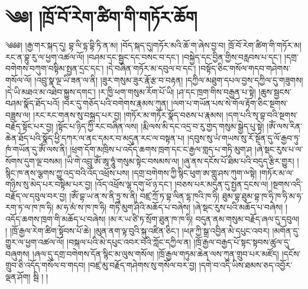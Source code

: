\setcounter{footnote}{0} 
\chapter{༄༅། །ཁྲོ་བོ་རེག་ཚིག་གི་གཏོར་ཆོག}༄༅༅། །རྒྱ་གར་སྐད་དུ། བྷ་ལི་དྷ་བྷི་ཏི་ན་མ། །བོད་སྐད་དུ།གཏོར་མའི་ཆོ་ག་ཞེས་བྱ་བ། ཁྲོ་བོ་རེག་ཚིག་གི་གཏོར་མ། རང་ན་བྷུ་རུ་ལ་ཕྱག་འཚལ་ལོ། །བཤམ་དང་སྦྱང་དང་བསང་བ་དང་། །བསྐྱེད་དང་བྱིན་གྱིས་བརླབས་པ་དང་། །དགྲ་བགེགས་བཀུག་བསྟིམ་སྤྱན་དྲང་དང་། །དེ་བཞིན་གཏོར་མ་དབུལ་བ་དང་། །བསྟོད་ཅིང་གསོལ་གདབ་གཤེགས་གསོལ་ལོ། །འབྲུ་སྣ་ལྔ་ཡི་ཟན་ལ་ནི། །ཟུར་གསུམ་ཟུར་རྣོ་རྩ་བ་བརྟན། །དཀྱིལ་མཐུག་དཔལ་བྱས་དཀྱིལ་དུ་གཟུགས། །དེ་ཡི་མཐའ་མ་འཐེབ་སྐྱུས་དགང་། །ར་ཁྱི་ཕག་གསུམ་རོག་པོ་ཡི། །ཤ་དང་ཁྲག་གིས་བརྒྱན་པ་སྟེ། །ཆུས་སྦྱངས་བཤམ་སྣོད་ཐོད་པའོ། །བར་དུ་གཅོད་པའི་བགེགས་རྣམས་ཀུན། །ལག་པ་གཡོན་པས་སེ་གོལ་རྟོག་ཅིང་སྔགས་བཟླས་ལ། །རང་རང་གནས་སུ་བསྐྲད་པར་བྱ། །གཏོར་མ་གཏོར་སྣོད་བཅས་པ་རྣམས། །དག་པའི་སྭ་བྷ་བའི་སྔགས་བརྗོད་སྟོང་པར་བྱ། །སྟོང་པ་ཉིད་ཀྱི་རང་བཞིན་ལས། །རྨི་ལས་མི་དང་འདྲ་བ་རུ་གྱད་གསུམ་སྒྱེད་པུ་སྟེ། །ཨོཾ་ལས་རིན་ཆེན་ཐོད་པའི་སྣོད་ཕྱི་དཀར་ལ་ནང་དམར་བ་མདུན་རང་ལ་བསྟན་པ། །དབུས་སུ་ཡཾ་གཡས་སུ་རོ་སྔོན་དུ་ལོ་རྒྱབ་ཏུ་ཁཾ་གཡོན་དུ་ཨོཾ་ལས་ནི། །ཕྲག་དོག་མཁྲིས་པ་འདོད་ཆགས་ཁྲག་དང་ང་རྒྱལ་གླད་པ་གཏི་མུག་ཤ །ཞེ་སྡང་རུས་པ་ལ་སོགས་དུག་ལྔ་བསམ། །ཡི་གེ་འབྲུ་ཨོཾ་ཨཱ་ཧཱུཾ་གསུམ་སྟེང་བསམས་ལ། །ཞུ་ནས་དངོས་པོ་ཐིམ་པའི་བདུད་རྩིར་གྱུར། །སྙིང་ཁ་ནས་ལྕགས་ཀྱུ་འདྲ་བའི་འོད་འཕྲོས་པས། །དགྲ་བགེགས་ཀྱི་སྙིང་ཕུག་ཨ་གླུ་ཤས་ཀུག་ྋསྟེ། །གཏོར་མ་ལ་གཉིས་སུ་མེད་པར་བསྟིམ་པར་བྱ། །འོད་འཕྲོས་ལྷ་དགུ་ཕོ་ཉ་དང་། །བཅས་པར་མདུན་དུ་སྤྱན་དྲངས་ལ། །སྔགས་འདི་བརྗོད་ལ་དབུལ་བར་བྱ། །ཨོཾ་བྷ་ཡ་ན་ས་ནི་ཏྲཱ་ས་ནི། བཛྲ་ཀྲོ་ཏ་བྷ་ལིན་དྷ་ཁའི་ཁ་ཧི། ཐུམ་བྷ་ཐུམ་བྷ་ཁ་ཧི་ཁ་ཧི་མ་ཧ་རག་ཏ་ལ་ཁ་ཁ་ཧི། མ་ཧ་མཾ་ས་ཁ་ཁ་ཧི། གཏི་མུག་ཤིའི་མཆོད་པ་བཞེས། །ཞེ་སྡང་རུས་པའི་མཆོད་པ་བཞེས། །འདོད་ཆགས་ཁྲག་གི་མཆོད་པ་བཞེས། །མ་ར་ཡ་ཙི་ཏ་སྲོག་ཐུན་ཁ་ཁ་ཧི། བདུན་ནམ་གསུམ་བརྗོད་ཞལ་དུ་དབུལ། ། །ཁྲོ་རྒྱལ་རེག་ཚིག་སྟོབས་པོ་ཆེ། །མུན་ནག་ལྟ་བུའི་སྐུ་འཛིན་ཅིང་། །ཕཊ་ཀྱི་སྒྲ་འབྱིན་མེ་དཔུང་འབར། །མགོན་དུ་གྱུར་ལ་ཕྱག་འཚལ་ལོ། །བསྐལ་པའི་མེ་དཔུང་འབར་བའི་ཀློང་དཀྱིལ་ན། །ཁྲོ་རྒྱལ་བརྒྱད་པོ་སྟང་སྟབས་ཚུལ་དུ་བཞུགས། །ཞལ་དུ་དགྲ་བགེགས་དོན་སྙིང་མ་ལུས་གསོལ། །ཁྲོ་རྒྱལ་གཏུམ་ཆེན་ལས་ཀུན་གྲུབ་པར་མཛོད། །དངོས་གྲུབ་ཅི་འདོད་གསོལ་བ་གདབ། །བཛྲ་མུ་བརྗོད་གཤེགས་སུ་གསོལ་བར་བྱ། །དགེ་བ་འདི་ཡིས་ཐམས་ཅད་འབྱོར་ལྡན་ཤོག། སྦི  ། །